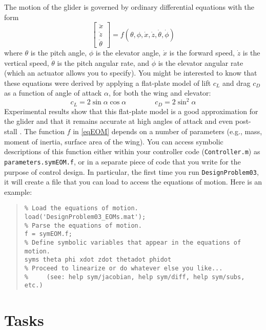 \documentclass[12pt]{article}
\begin{document}
The motion of the glider is governed by ordinary differential equations with the form
\begin{equation}
\label{eqEOM}
\begin{bmatrix} \ddot{x} \\ \ddot{z} \\ \ddot{\theta} \end{bmatrix} = f(\theta,\phi,\dot{x},\dot{z},\dot{\theta},\dot{\phi})
\end{equation}
where $\theta$ is the pitch angle, $\phi$ is the elevator angle, $\dot{x}$ is the forward speed, $\dot{z}$ is the vertical speed, $\dot{\theta}$ is the pitch angular rate, and $\dot{\phi}$ is the elevator angular rate (which an actuator allows you to specify). You might be interested to know that these equations were derived by applying a flat-plate model of lift $c_{L}$ and drag $c_{D}$ as a function of angle of attack $\alpha$, for both the wing and elevator:
\begin{equation*}
c_{L} = 2\sin\alpha \cos\alpha
\qquad\qquad
c_{D} = 2\sin^{2}\alpha
\end{equation*}
Experimental results show that this flat-plate model is a good approximation for the glider and that it remains accurate at high angles of attack and even post-stall \cite{Moore2014}. The function $f$ in \eqref{eqEOM} depends on a number of parameters (e.g., mass, moment of inertia, surface area of the wing). You can access symbolic descriptions of this function either within your controller code (\lstinline|Controller.m|) as \lstinline|parameters.symEOM.f|, or in a separate piece of code that you write for the purpose of control design. In particular, the first time you run \lstinline|DesignProblem03|, it will create a file that you can load to access the equations of motion. Here is an example:
\begin{quote}
\begin{lstlisting}
% Load the equations of motion.
load('DesignProblem03_EOMs.mat');
% Parse the equations of motion.
f = symEOM.f;
% Define symbolic variables that appear in the equations of motion.
syms theta phi xdot zdot thetadot phidot
% Proceed to linearize or do whatever else you like...
%     (see: help sym/jacobian, help sym/diff, help sym/subs, etc.)
\end{lstlisting}
\end{quote}


\section{Tasks}
\end{document}
